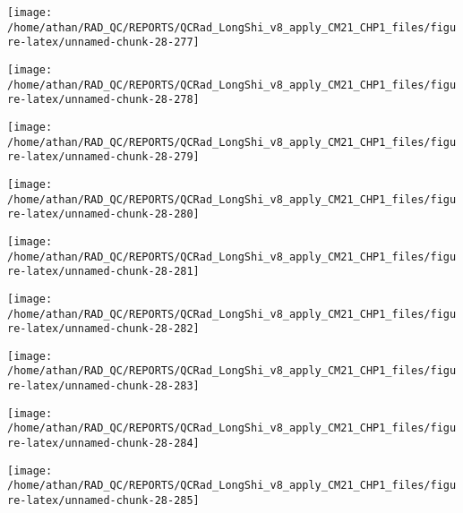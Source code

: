 \documentclass[
  10pt,
  a4paper,oneside]{article}
\begin{document}
\begin{center}\texttt{[image: /home/athan/RAD\_QC/REPORTS/QCRad\_LongShi\_v8\_apply\_CM21\_CHP1\_files/figure-latex/unnamed-chunk-28-277]} \end{center}

\begin{center}\texttt{[image: /home/athan/RAD\_QC/REPORTS/QCRad\_LongShi\_v8\_apply\_CM21\_CHP1\_files/figure-latex/unnamed-chunk-28-278]} \end{center}

\begin{center}\texttt{[image: /home/athan/RAD\_QC/REPORTS/QCRad\_LongShi\_v8\_apply\_CM21\_CHP1\_files/figure-latex/unnamed-chunk-28-279]} \end{center}

\begin{center}\texttt{[image: /home/athan/RAD\_QC/REPORTS/QCRad\_LongShi\_v8\_apply\_CM21\_CHP1\_files/figure-latex/unnamed-chunk-28-280]} \end{center}

\begin{center}\texttt{[image: /home/athan/RAD\_QC/REPORTS/QCRad\_LongShi\_v8\_apply\_CM21\_CHP1\_files/figure-latex/unnamed-chunk-28-281]} \end{center}

\begin{center}\texttt{[image: /home/athan/RAD\_QC/REPORTS/QCRad\_LongShi\_v8\_apply\_CM21\_CHP1\_files/figure-latex/unnamed-chunk-28-282]} \end{center}

\begin{center}\texttt{[image: /home/athan/RAD\_QC/REPORTS/QCRad\_LongShi\_v8\_apply\_CM21\_CHP1\_files/figure-latex/unnamed-chunk-28-283]} \end{center}

\begin{center}\texttt{[image: /home/athan/RAD\_QC/REPORTS/QCRad\_LongShi\_v8\_apply\_CM21\_CHP1\_files/figure-latex/unnamed-chunk-28-284]} \end{center}

\begin{center}\texttt{[image: /home/athan/RAD\_QC/REPORTS/QCRad\_LongShi\_v8\_apply\_CM21\_CHP1\_files/figure-latex/unnamed-chunk-28-285]} \end{center}
\end{document}
